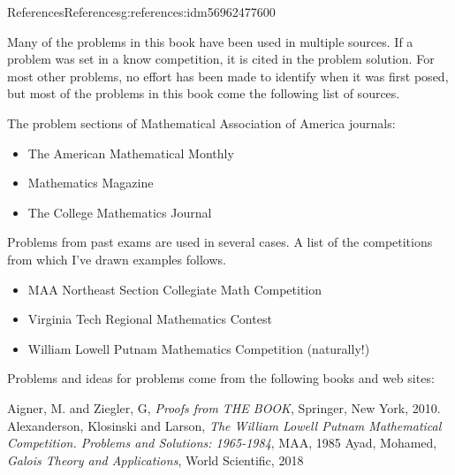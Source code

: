 \documentclass[twoside,10pt,]{book}
\numberwithin{equation}{section}
\providecommand\phantomsection{}
\begin{document}
%
\backmatter%
%
\clearpage\phantomsection%
%
%
%
\typeout{************************************************}
\typeout{************************************************}
%
\begin{references-chapter-numberless}{References}{}{References}{}{}{g:references:idm56962477600}
%
\begin{introduction}{}%
Many of the problems in this book have been used in multiple sources.  If  a problem was set in a know competition, it is cited in the problem solution.   For most other problems, no effort has been made to identify when it was first posed, but most of the problems in this book come the following list of sources.%
\par
The problem sections of  Mathematical Association of America journals:%
\begin{itemize}[label=\textbullet]
\item{}The American Mathematical Monthly%
\item{}Mathematics Magazine%
\item{}The College Mathematics Journal%
\end{itemize}
%
\par
Problems from past exams are used in several cases.  A list of the competitions from which I've drawn examples follows.%
\begin{itemize}[label=\textbullet]
\item{}MAA Northeast Section Collegiate Math Competition%
\item{}Virginia Tech Regional Mathematics Contest%
\item{}William Lowell Putnam Mathematics Competition (naturally!)%
\end{itemize}
%
\par
Problems and ideas for problems come from the following books and web sites:%
\end{introduction}%
\begin{referencelist}
\hypertarget{x:biblio:biblio-aigner}{}Aigner, M. and Ziegler, G, \textit{Proofs from THE BOOK}, Springer, New York, 2010.
\hypertarget{x:biblio:biblio-putnam-2}{}Alexanderson, Klosinski and Larson, \textit{The William Lowell Putnam Mathematical Competition. Problems and Solutions: 1965-1984}, MAA, 1985
\hypertarget{x:biblio:biblio-ayad-2018}{}Ayad, Mohamed, \textit{Galois Theory and Applications}, World Scientific, 2018

\end{referencelist}
\end{references-chapter-numberless}
\end{document}
